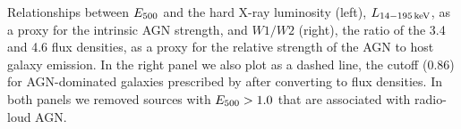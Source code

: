 \label{fig:excess_vs_agn} Relationships between $E_{\rm 500}$ and the hard X-ray luminosity (left), $L_{\rm 14-195\,keV}$, as a proxy for the intrinsic AGN strength, and $W1/W2$ (right), the ratio of the 3.4 and 4.6 \um{} flux densities, as a proxy for the relative strength of the AGN to host galaxy emission. In the right panel we also plot as a dashed line, the cutoff (0.86) for AGN-dominated galaxies prescribed by \citet{Stern:2012mz} after converting to flux densities. In both panels we removed sources with $E_{\rm 500} > 1.0$ that are associated with radio-loud AGN.
  
  
  
  